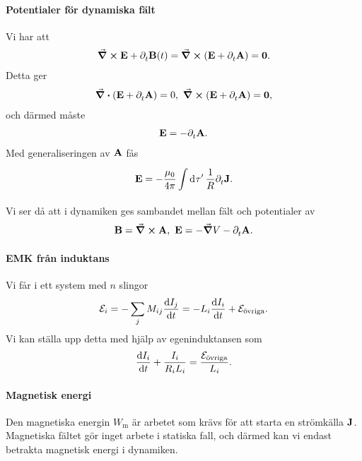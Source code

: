 \paragraph{Potentialer för dynamiska fält}
Vi har att
\begin{align*}
	\curl{\vb{E}} + \partial_{t}^{}\vb{B}(t) = \curl(\vb{E} + \partial_{t}^{}\vb{A}) = \vb{0}.
\end{align*}
Detta ger
\begin{align*}
	\div(\vb{E} + \partial_{t}^{}\vb{A}) = 0,\ \curl(\vb{E} + \partial_{t}^{}\vb{A}) = \vb{0},
\end{align*}
och därmed måste
\begin{align*}
	\vb{E} = -\partial_{t}^{}\vb{A}.
\end{align*}
Med generaliseringen av $\vb{A}$ fås
\begin{align*}
	\vb{E} = -\frac{\mu_{0}}{4\pi}\int\limits_{}^{}\dd[]{\tau'}\frac{1}{R}\partial_{t}^{}\vb{J}.
\end{align*}
Vi ser då att i dynamiken ges sambandet mellan fält och potentialer av
\begin{align*}
	\vb{B} = \curl{\vb{A}},\ \vb{E} = -\grad{V} - \partial_{t}^{}\vb{A}.
\end{align*}

\paragraph{EMK från induktans}
Vi får i ett system med $n$ slingor
\begin{align*}
	\mathcal{E}_{i} = -\sum\limits_{j}M_{ij}\dv{I_{j}}{t} = -L_{i}\dv{I_{i}}{t} + \mathcal{E}_{\text{övriga}}.
\end{align*}
Vi kan ställa upp detta med hjälp av egeninduktansen som
\begin{align*}
	\dv{I_{i}}{t} + \frac{I_{i}}{R_{i}L_{i}} = \frac{\mathcal{E}_{\text{övriga}}}{L_{i}}.
\end{align*}

\paragraph{Magnetisk energi}
Den magnetiska energin $W_{\text{m}}$ är arbetet som krävs för att starta en strömkälla $\vb{J}$. Magnetiska fältet gör inget arbete i statiska fall, och därmed kan vi endast betrakta magnetisk energi i dynamiken.

